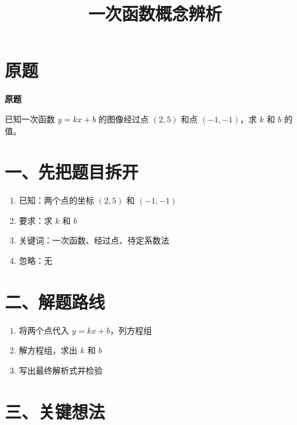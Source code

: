 \documentclass{exam-zh}
\begin{document}
\title{一次函数概念辨析}
\subject{图像与解析式 · 讲解}
\maketitle

\section*{原题}


\begin{keyideabox}
\textbf{原题}\par  已知一次函数 $y=kx+b$ 的图像经过点 $(2,5)$ 和点 $(-1,-1)$，求 $k$ 和 $b$ 的值。
\end{keyideabox}



\section*{一、先把题目拆开}


\begin{routemap}
  \begin{enumerate}
    \item 已知：两个点的坐标 $(2,5)$ 和 $(-1,-1)$
    \item 要求：求 $k$ 和 $b$
    \item 关键词：一次函数、经过点、待定系数法
    \item 忽略：无
  \end{enumerate}
\end{routemap}



\section*{二、解题路线}


\begin{routemap}
  \begin{enumerate}
    \item 将两个点代入 $y=kx+b$，列方程组
    \item 解方程组，求出 $k$ 和 $b$
    \item 写出最终解析式并检验
  \end{enumerate}
\end{routemap}



\section*{三、关键想法}
\end{document}
